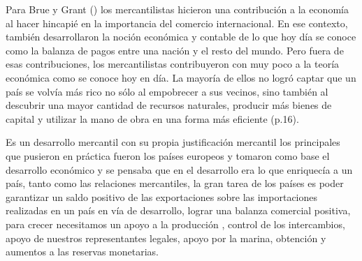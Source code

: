 \documentclass[
  jou,
  floatsintext,
  longtable,
  a4paper,
  nolmodern,
  notxfonts,
  notimes,
  colorlinks=true,linkcolor=blue,citecolor=blue,urlcolor=blue]{apa7}
\begin{document}
Para Brue y Grant
() los
mercantilistas hicieron una contribución a la economía al hacer hincapié
en la importancia del comercio internacional. En ese contexto, también
desarrollaron la noción económica y contable de lo que hoy día se conoce
como la balanza de pagos entre una nación y el resto del mundo. Pero
fuera de esas contribuciones, los mercantilistas contribuyeron con muy
poco a la teoría económica como se conoce hoy en día. La mayoría de
ellos no logró captar que un país se volvía más rico no sólo al
empobrecer a sus vecinos, sino también al descubrir una mayor cantidad
de recursos naturales, producir más bienes de capital y utilizar la mano
de obra en una forma más eficiente (p.16).

Es un desarrollo mercantil con su propia justificación mercantil los
principales que pusieron en práctica fueron los países europeos y
tomaron como base el desarrollo económico y se pensaba que en el
desarrollo era lo que enriquecía a un país, tanto como las relaciones
mercantiles, la gran tarea de los países es poder garantizar un saldo
positivo de las exportaciones sobre las importaciones realizadas en un
país en vía de desarrollo, lograr una balanza comercial positiva, para
crecer necesitamos un apoyo a la producción , control de los
intercambios, apoyo de nuestros representantes legales, apoyo por la
marina, obtención y aumentos a las reservas monetarias.
\end{document}
